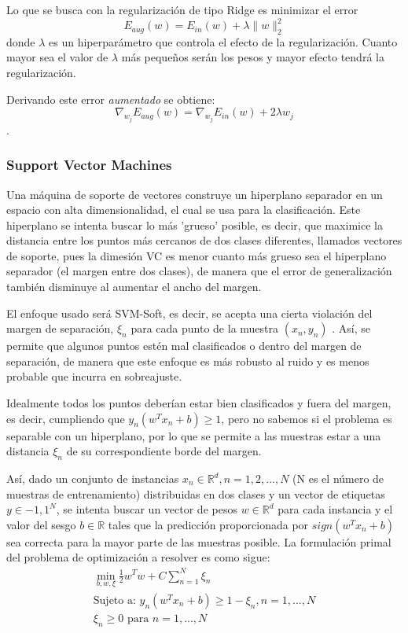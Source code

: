 \documentclass[a4]{article}
\begin{document}
Lo que se busca con la regularización de tipo Ridge es minimizar el error $$ E_{aug}(w)=E_{in}(w)+\lambda \|w\|_2^2$$ donde $\lambda$ es un hiperparámetro que controla el efecto de la regularización. Cuanto mayor sea el valor de $\lambda$ más pequeños serán los pesos y mayor efecto tendrá la regularización.

Derivando este error \textit{aumentado} se obtiene: $$ \nabla_{w_j} E_{aug}(w)=\nabla_{w_j} E_{in}(w)+2\lambda w_j$$.


\subsubsection{Support Vector Machines}

Una máquina de soporte de vectores construye un hiperplano separador en un espacio con alta dimensionalidad, el cual se usa para la clasificación. Este hiperplano se intenta buscar lo más 'grueso' posible, es decir, que maximice la distancia entre los puntos más cercanos de dos clases diferentes, llamados vectores de soporte, pues la dimesión VC es menor cuanto más grueso sea el hiperplano separador (el margen entre dos clases), de manera que el error de generalización también disminuye al aumentar el ancho del margen.   

El enfoque usado será SVM-Soft, es decir, se acepta una cierta violación del margen de separación, $\xi_n$ para cada punto de la muestra $(x_n,y_n)$ . Así, se permite que algunos puntos estén mal clasificados o dentro del margen de separación, de manera que este enfoque es más robusto al ruido y es menos probable que incurra en sobreajuste. 

Idealmente todos los puntos deberían estar bien clasificados y fuera del margen, es decir, cumpliendo que $y_n(w^Tx_n+b)\geq 1$, pero no sabemos si el problema es separable con un hiperplano, por lo que se permite a las muestras estar a una distancia $\xi_n$ de su correspondiente borde del margen. 

Así, dado un conjunto de instancias $x_n\in\mathbb{R}^d, n=1,2,...,N$ (N es el número de muestras de entrenamiento) distribuidas en dos clases y un vector de etiquetas $y\in {-1,1}^N$, se intenta buscar un vector de pesos $w \in \mathbb{R}^d$ para cada instancia y el valor del sesgo $b \in \mathbb{R}$ tales que la predicción proporcionada por $sign(w^Tx_n+b)$ sea correcta para la mayor parte de las muestras posible. La formulación primal del problema de optimización a resolver es como sigue: 
\begin{align*}
\min\limits_{b,w,\xi}\frac{1}{2}w^Tw + C \sum_{n=1}^{N}\xi_n\\
\text{Sujeto a: }  y_n(w^Tx_n + b)\geq 1 - \xi_n, n=1,...,N\\
\xi_n \geq 0 \text{ para } n=1,...,N
\end{align*}
\end{document}

